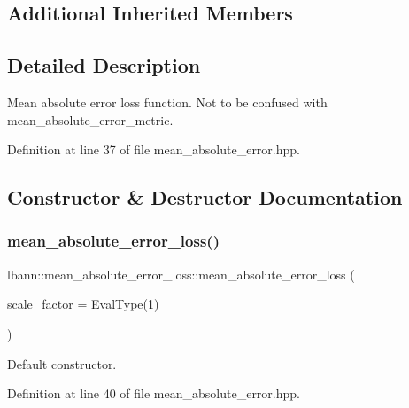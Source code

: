 \subsection*{Additional Inherited Members}


\subsection{Detailed Description}
Mean absolute error loss function. Not to be confused with mean\+\_\+absolute\+\_\+error\+\_\+metric. 

Definition at line 37 of file mean\+\_\+absolute\+\_\+error.\+hpp.



\subsection{Constructor \& Destructor Documentation}
\mbox{\label{classlbann_1_1mean__absolute__error__loss_a80845866345cf8c4daba645683022bc2}} 
\subsubsection{\texorpdfstring{mean\+\_\+absolute\+\_\+error\+\_\+loss()}{mean\_absolute\_error\_loss()}\hspace{0.1cm}{\footnotesize\ttfamily [1/2]}}
{\footnotesize\ttfamily lbann\+::mean\+\_\+absolute\+\_\+error\+\_\+loss\+::mean\+\_\+absolute\+\_\+error\+\_\+loss (\begin{DoxyParamCaption}\item[{\hyperlink{base_8hpp_a3266f5ac18504bbadea983c109566867}{Eval\+Type}}]{scale\+\_\+factor = {\ttfamily \hyperlink{base_8hpp_a3266f5ac18504bbadea983c109566867}{Eval\+Type}(1)} }\end{DoxyParamCaption})\hspace{0.3cm}{\ttfamily [inline]}}

Default constructor. 

Definition at line 40 of file mean\+\_\+absolute\+\_\+error.\+hpp.


